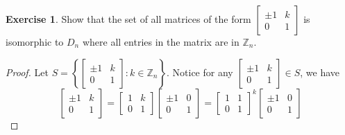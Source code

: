 \documentclass{article}
\theoremstyle{definition}
\newtheorem{theorem}{Exercise}[section]
\newcommand{\Z}{\mathbb{Z}}
\begin{document}
	\setcounter{theorem}{13}
	\begin{theorem}
		Show that the set of all matrices of the form $\left[\begin{smallmatrix} \pm1&k\\0&1\end{smallmatrix}\right]$ is isomorphic to $D_n$ where all entries in the matrix are in $\Z_n$. 
	\end{theorem}
	\begin{proof}
		Let $S = \left\{\left[\begin{smallmatrix} \pm1&k\\0&1\end{smallmatrix}\right] : k\in\Z_n\right\}$. Notice for any $\left[\begin{smallmatrix} \pm1&k\\0&1\end{smallmatrix}\right]\in S$, we have \[\begin{bmatrix}
		\pm1 & k \\ 
		0 & 1
		\end{bmatrix} = \begin{bmatrix}
		1 & k \\ 
		0 & 1
		\end{bmatrix} \begin{bmatrix}
		\pm1 & 0 \\ 
		0 & 1
		\end{bmatrix} = \begin{bmatrix}
		1 & 1 \\ 
		0 & 1
		\end{bmatrix}^k \begin{bmatrix}
		\pm1 & 0 \\ 
		0 & 1

\end{bmatrix}\]
\end{proof}
\end{document}
